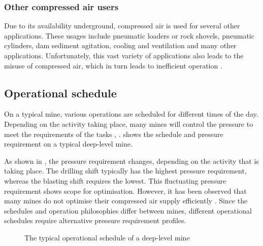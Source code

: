 \subsubsection{Other compressed air users}
Due to its availability underground, compressed air is used for several other applications. These usages include pneumatic loaders or rock shovels, pneumatic cylinders, dam sediment agitation, cooling and ventilation and many other applications. Unfortunately, this vast variety of applications also leads to the misuse of compressed air, which in turn leads to inefficient operation \cite{Marais2012PhD}.
\subsection{Operational schedule}
On a typical mine, various operations are scheduled for different times of the day. Depending on the activity taking place, many mines will control the pressure to meet the requirements of the tasks \cite{Marais2012PhD}, \cite{Kriel2014Masters}.  shows the schedule and pressure requirement on a typical deep-level mine.
\par 
\clearpage
As shown in , the pressure requirement changes, depending on the activity that is taking place. The drilling shift typically has the highest pressure requirement, whereas the blasting shift requires the lowest. This fluctuating pressure requirement shows scope for optimisation. However, it has been observed that many mines do not optimise their compressed air supply efficiently \cite{padachi2009energy}.
Since the schedules and operation philosophies differ between mines, different operational schedules require alternative pressure requirement profiles.
\par 
\begin{figure}[!htbp]
	\centering
	\fbox{}
	\caption[A typical operational schedule of a deep-level mine]{The typical operational schedule of a deep-level mine \cite{Kriel2014Masters}}
	\label{fig: Mining schedule}
\end{figure}
